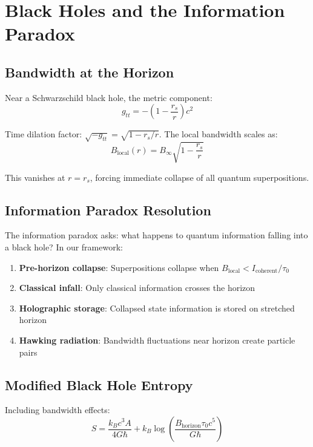 \documentclass[twocolumn,prd,amsmath,amssymb,aps,superscriptaddress,nofootinbib]{revtex4-2}
\begin{document}
\section{Black Holes and the Information Paradox}
\label{sec:blackholes}

\subsection{Bandwidth at the Horizon}

Near a Schwarzschild black hole, the metric component:
\begin{equation}
g_{tt} = -\left(1 - \frac{r_s}{r}\right)c^2
\end{equation}

Time dilation factor: $\sqrt{-g_{tt}} = \sqrt{1 - r_s/r}$. The local bandwidth scales as:
\begin{equation}
B_{\text{local}}(r) = B_\infty \sqrt{1 - \frac{r_s}{r}}
\label{eq:horizon_bandwidth}
\end{equation}

This vanishes at $r = r_s$, forcing immediate collapse of all quantum superpositions.

\subsection{Information Paradox Resolution}

The information paradox asks: what happens to quantum information falling into a black hole? In our framework:

\begin{enumerate}
\item \textbf{Pre-horizon collapse}: Superpositions collapse when $B_{\text{local}} < I_{\text{coherent}}/\tau_0$
\item \textbf{Classical infall}: Only classical information crosses the horizon
\item \textbf{Holographic storage}: Collapsed state information is stored on stretched horizon
\item \textbf{Hawking radiation}: Bandwidth fluctuations near horizon create particle pairs
\end{enumerate}

\subsection{Modified Black Hole Entropy}

Including bandwidth effects:
\begin{equation}
S = \frac{k_B c^3 A}{4G\hbar} + k_B \log\left(\frac{B_{\text{horizon}} \tau_0 c^5}{G\hbar}\right)
\end{equation}
\end{document}
